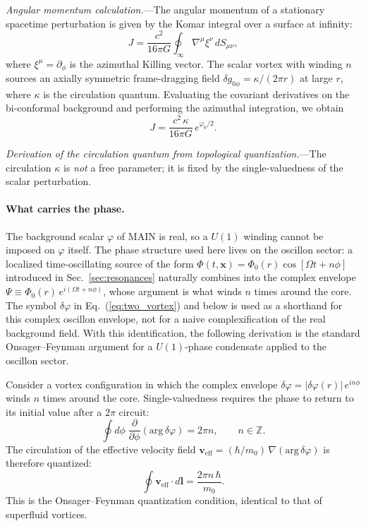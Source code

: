 \documentclass[aps,prd,onecolumn,superscriptaddress,nofootinbib,showpacs,12pt,notitlepage]{revtex4-2}
\begin{document}
\textit{Angular momentum calculation.}---The angular momentum
of a stationary spacetime perturbation is given by the Komar
integral over a surface at infinity:
\begin{equation}\label{eq:komar_J}
  J = \frac{c^{2}}{16\pi G} \oint_{\infty} \nabla^\mu \xi^\nu \, dS_{\mu\nu},
\end{equation}
where $\xi^\mu = \partial_\phi$ is the azimuthal Killing vector.
The scalar vortex with winding $n$ sources an axially symmetric
frame-dragging field $\delta g_{0\phi} = \kappa/(2\pi r)$ at
large $r$, where $\kappa$ is the circulation quantum.
Evaluating the covariant derivatives on the bi-conformal
background and performing the azimuthal integration, we obtain
\begin{equation}\label{eq:J_vortex_derived}
  J = \frac{c^{2}\,\kappa}{16\pi G}\, e^{\varphi_{0}/2}.
\end{equation}

\textit{Derivation of the circulation quantum from
topological quantization.}---The circulation $\kappa$ is
\emph{not} a free parameter; it is fixed by the
single-valuedness of the scalar perturbation.

\paragraph{What carries the phase.}
The background scalar $\varphi$ of MAIN is real, so a
$U(1)$ winding cannot be imposed on $\varphi$ itself.
The phase structure used here lives on the
oscillon sector: a localized time-oscillating source of
the form $\Phi(t,\mathbf x) = \Phi_0(r)\cos[\Omega t + n\phi]$
introduced in Sec.~\ref{sec:resonances} naturally
combines into the complex envelope
$\Psi \equiv \Phi_0(r)\,e^{i(\Omega t + n\phi)}$, whose
argument is what winds $n$ times around the core.  The
symbol $\delta\varphi$ in Eq.~(\ref{eq:two_vortex}) and
below is used as a shorthand for this complex oscillon
envelope, not for a naive complexification of the real
background field.  With this identification, the
following derivation is the standard
Onsager--Feynman argument for a $U(1)$-phase condensate
applied to the oscillon sector.

Consider a vortex configuration in which the complex
envelope
$\delta\varphi = |\delta\varphi(r)|\,e^{in\phi}$ winds
$n$ times around the core.  Single-valuedness requires the
phase to return to its initial value after a $2\pi$ circuit:
\begin{equation}\label{eq:single_valued}
  \oint d\phi\;\frac{\partial}{\partial\phi}
    (\mathrm{arg}\,\delta\varphi)
  = 2\pi n, \qquad n \in \mathbb{Z}.
\end{equation}
The circulation of the effective velocity field
$\mathbf{v}_{\mathrm{eff}} = (\hbar/m_0)\,\nabla(\mathrm{arg}\,
\delta\varphi)$ is therefore quantized:
\begin{equation}\label{eq:circ_quantized}
  \oint \mathbf{v}_{\mathrm{eff}}\cdot d\mathbf{l}
  = \frac{2\pi n\,\hbar}{m_{0}}.
\end{equation}
This is the Onsager--Feynman quantization condition,
identical to that of superfluid vortices.
\end{document}
